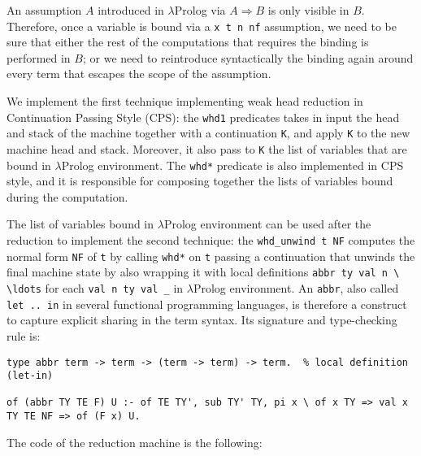 An assumption $A$ introduced in $\lambda$Prolog via $A \Rightarrow B$ is only visible in $B$. Therefore, once a variable is bound via a \verb+x t n nf+ assumption, we need to be sure that either the rest of the computations that requires the binding is performed in $B$; or we need to reintroduce syntactically the binding again around every term that escapes the scope of the assumption.

We implement the first technique implementing weak head reduction in Continuation Passing Style (CPS): the \verb+whd1+ predicates takes in input the head and stack of the machine together with a continuation \verb+K+, and apply \verb+K+ to the new machine head and stack. Moreover, it also pass to \verb+K+ the list of variables that are bound in $\lambda$Prolog environment. The \verb+whd*+ predicate is also implemented in CPS style, and it is responsible for composing together the lists of variables bound during the computation.

The list of variables bound in $\lambda$Prolog environment can be used after the reduction to implement the second technique: the \verb+whd_unwind t NF+ computes the normal form \verb+NF+ of \verb+t+ by calling \verb+whd*+ on \verb+t+ passing a continuation that unwinds the final machine state by also wrapping it with local definitions \verb+abbr ty val n \ \ldots+ for each \verb+val n ty val _+ in $\lambda$Prolog environment. An \verb+abbr+, also called \verb+let .. in+ in several functional programming languages, is therefore a construct to capture explicit sharing in the term syntax. Its signature and type-checking rule is:

\begin{Verbatim}
type abbr term -> term -> (term -> term) -> term.  % local definition (let-in)

of (abbr TY TE F) U :- of TE TY', sub TY' TY, pi x \ of x TY => val x TY TE NF => of (F x) U.
\end{Verbatim}

The code of the reduction machine is the following:

